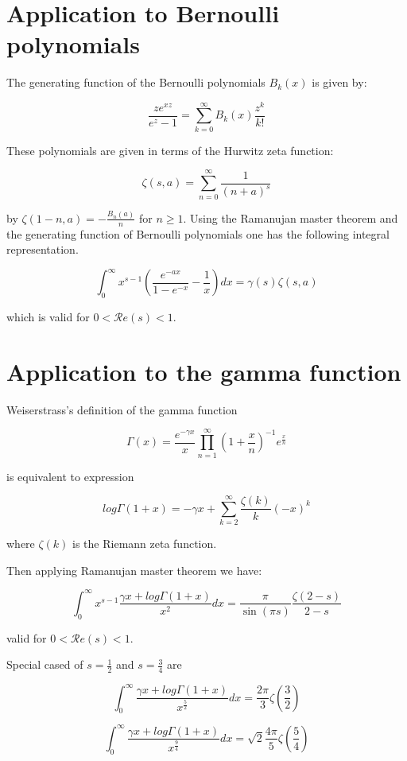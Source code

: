 \documentclass{article}
\begin{document}
\section{Application to Bernoulli polynomials}

The generating function of the Bernoulli polynomials $B_k(x)$ is given by:

$$
\frac{z e^{xz}}{e^z - 1} = \sum_{k=0}^\infty B_k (x) \frac{z^k}{k!}
$$

These polynomials are given in terms of the Hurwitz zeta function:

$$
\zeta(s,a) = \sum_{n=0}^\infty \frac{1}{(n+a)^s}
$$

by $\zeta(1-n,a) = - \frac{B_n (a)}{n}$ for $n \geq 1$. Using the Ramanujan master theorem and the generating function of Bernoulli polynomials one has the following integral representation.\cite{ramanujan_journal2}

$$
\int_0^\infty x^{s-1} \left(\frac{e^{-ax}}{1 - e^{-x}} - \frac{1}{x} \right) dx = \gamma (s) \zeta(s,a)
$$

which is valid for $0 < \mathcal{R} e (s) < 1$.

\section{Application to the gamma function}

Weiserstrass's definition of the gamma function

$$
\Gamma(x) = \frac{e^{-\gamma x}}{x} \prod_{n=1}^\infty \left(1+\frac{x}{n}\right)^{-1} e^{\frac{x}{n}}
$$

is equivalent to expression

$$
log\Gamma(1+x) = -\gamma x + \sum_{k=2}^\infty \frac{\zeta(k)}{k} (-x)^k
$$

where $\zeta(k)$ is the Riemann zeta function.

Then applying Ramanujan master theorem we have:

$$
\int_0^\infty x^{s-1} \frac{\gamma x + log\Gamma(1 + x)}{x^2} dx = \frac{\pi}{\sin(\pi s)} \frac{\zeta(2-s)}{2-s}
$$

valid for  $0 < \mathcal{R} e (s) < 1$.

Special cased of $s=\frac{1}{2}$ and $s=\frac{3}{4}$ are

$$
\int_0^\infty \frac{\gamma x + log\Gamma (1+x)}{x^\frac{5}{2}} dx = \frac{2\pi}{3}\zeta\left(\frac{3}{2}\right)
$$

$$
\int_0^\infty \frac{\gamma x + log\Gamma(1+x)}{x^\frac{9}{4}} dx = \sqrt{2}\frac{4\pi}{5}\zeta\left(\frac{5}{4}\right)
$$
\end{document}
